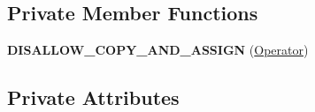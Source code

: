 \subsection*{Private Member Functions}
\begin{DoxyCompactItemize}
\item 
{\bfseries D\+I\+S\+A\+L\+L\+O\+W\+\_\+\+C\+O\+P\+Y\+\_\+\+A\+N\+D\+\_\+\+A\+S\+S\+I\+GN} (\hyperlink{classv8_1_1internal_1_1compiler_1_1_operator}{Operator})\hypertarget{classv8_1_1internal_1_1compiler_1_1_operator_a642ff72c07dd81a43ae99acc314339ff}{}\label{classv8_1_1internal_1_1compiler_1_1_operator_a642ff72c07dd81a43ae99acc314339ff}

\end{DoxyCompactItemize}
\subsection*{Private Attributes}
